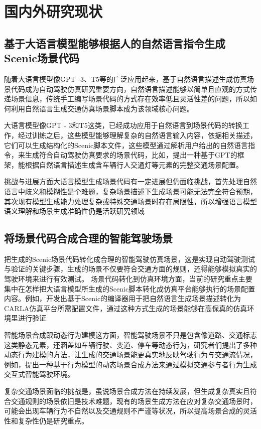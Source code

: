 	
\section{国内外研究现状}
\subsection{基于大语言模型能够根据人的自然语言指令生成Scenic场景代码}
随着大语言模型像GPT -3、T5等的广泛应用起来，基于自然语言描述生成仿真场景代码成为自动驾驶仿真研究重要方向，自然语言描述能够以简单且直观的方式传递场景信息\cite{klischat2020scenario}，传统手工编写场景代码的方式存在效率低且灵活性差的问题，所以如何利用自然语言生成交通仿真场景脚本成为该领域核心问题。
	
大语言模型像GPT - 3和T5这类\cite{Xu2023DriveGPT4}，已经成功应用于自然语言到场景代码的转换工作，经过训练之后，这些模型能够理解复杂的自然语言输入内容，依据相关描述，它们可以生成结构化的Scenic脚本文件\cite{scenario_runner_contributors2019carla}，这些模型通过解析用户给出的自然语言指令，来生成符合自动驾驶仿真要求的场景代码，比如，提出一种基于GPT的框架，能根据自然语言描述生成含车辆行人交通灯等元素的完整交通场景配置。
	
挑战与进展方面大语言模型生成场景代码有一定进展但仍面临挑战，首先处理自然语言中歧义和模糊性是个难题，复杂场景描述下生成场景可能无法完全符合预期，其次现有模型生成能力处理复杂或特殊交通场景时存在局限性，所以增强语言模型语义理解和场景生成准确性仍是活跃研究领域
	
	\subsection{将场景代码合成合理的智能驾驶场景}
把生成的Scenic场景代码转化成合理的智能驾驶仿真场景，这是实现自动驾驶测试与验证的关键步骤，生成的场景不仅要符合交通方面的规则，还得能够模拟真实的驾驶环境来进行有效测试。
	场景代码转化到仿真环境方面，当前的研究重点主要集中在怎样把大语言模型所生成的Scenic脚本转化成仿真平台能够执行的场景配置内容。例如，开发出基于Scenic的编译器用于把自然语言生成场景描述转化为CARLA仿真平台所需配置文件，通过这种方式生成的场景能够在高保真的仿真环境里进行验证
	
智能场景合成跟动态行为建模这方面，智能驾驶场景不只是包含像道路、交通标志这类静态元素，还涵盖如车辆行驶、变道、停车等动态行为，研究者们提出了多种动态行为建模的方法，让生成的交通场景能更真实地反映驾驶行为与交通流情况，例如，提出一种基于行为模型的动态场景合成方法来通过模拟交通参与者行为生成交互式智能驾驶环境。
	
复杂交通场景面临的挑战是，虽说场景合成方法在持续发展，但生成复杂真实且符合交通规则的场景依旧是技术难题，现有的场景生成方法在应对复杂交通场景时，可能会出现车辆行为不自然以及交通规则不严谨等状况，所以提高场景合成的灵活性和复杂性仍是研究重点。
	

